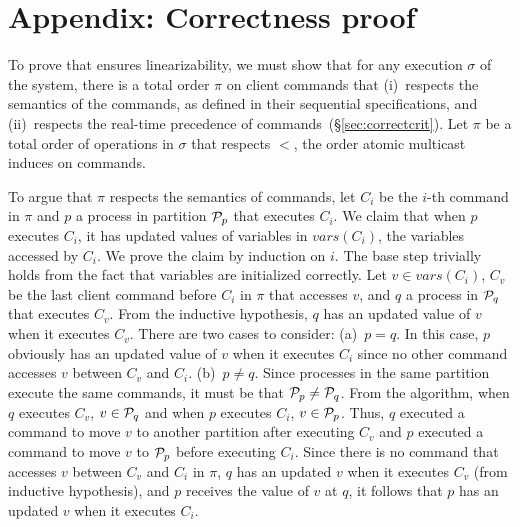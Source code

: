 
%
%

\section*{Appendix: Correctness proof}
\label{sec:correctness}

\newcommand{\tsc}{\ensuremath{t^{cli}_{start}}}
\newcommand{\tec}{\ensuremath{t^{cli}_{end}}}
\newcommand{\tes}{\ensuremath{t^{srv}_{end}}}
\newcommand{\tss}{\ensuremath{t^{srv}_{start}}}

To prove that \dynastar ensures linearizability, we must show that for any execution $\sigma$ of the system, there is a total order $\pi$ on client commands that 
(i)~respects the semantics of the commands, as defined in their sequential specifications, and 
(ii)~respects the real-time precedence of commands~(\S\ref{sec:correctcrit}).
%
Let $\pi$ be a total order of operations in $\sigma$ that respects $<$, the order atomic multicast induces on commands.

To argue that $\pi$ respects the semantics of  commands, let $C_i$ be the $i$-th command in $\pi$ and $p$ a process in partition $\mathcal{P}_p$ that executes $C_i$.
We claim that when $p$ executes $C_i$, it has updated values of variables in $vars(C_i)$, the variables accessed by $C_i$.
We prove the claim by induction on $i$.
The base step trivially holds from the fact that variables are initialized correctly.
Let $v \in vars(C_i)$, $C_v$ be the last client command before $C_i$ in $\pi$ that accesses $v$, and $q$ a process in $\mathcal{P}_q$ that executes $C_v$.
From the inductive hypothesis, $q$ has an updated value of $v$ when it executes $C_v$.
There are two cases to consider:
(a)~$p = q$. In this case, $p$ obviously has an updated value of $v$ when it executes $C_i$ since no other command accesses $v$ between $C_v$ and $C_i$.
(b)~$p \neq q$. 
Since processes in the same partition execute the same commands, it must be that $\mathcal{P}_p \neq \mathcal{P}_q$.
From the algorithm, when $q$ executes $C_v$, $v \in \mathcal{P}_q$ and when $p$ executes $C_i$, $v \in \mathcal{P}_p$.
Thus, $q$ executed a command to move $v$ to another partition after executing $C_v$ and $p$ executed a command to move $v$ to $\mathcal{P}_p$ before executing $C_i$.
Since there is no command that accesses $v$ between $C_v$ and $C_i$ in $\pi$, $q$ has an updated $v$ when it executes $C_v$ (from inductive hypothesis), and $p$ receives the value of $v$ at $q$, it follows that $p$ has an updated $v$ when it executes $C_i$.

